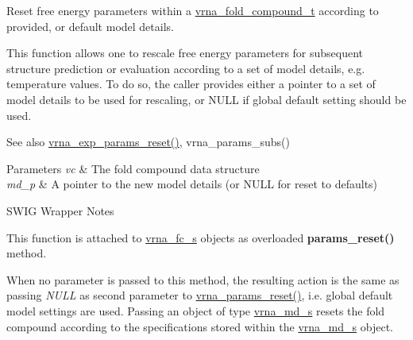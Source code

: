 Reset free energy parameters within a \hyperlink{group__fold__compound_ga1b0cef17fd40466cef5968eaeeff6166}{vrna\+\_\+fold\+\_\+compound\+\_\+t} according to provided, or default model details. 

This function allows one to rescale free energy parameters for subsequent structure prediction or evaluation according to a set of model details, e.\+g. temperature values. To do so, the caller provides either a pointer to a set of model details to be used for rescaling, or N\+U\+LL if global default setting should be used.

\begin{DoxySeeAlso}{See also}
\hyperlink{group__energy__parameters_gaa5409218068be84d7b50c78fbdaa85a9}{vrna\+\_\+exp\+\_\+params\+\_\+reset()}, vrna\+\_\+params\+\_\+subs() 
\end{DoxySeeAlso}

\begin{DoxyParams}{Parameters}
{\em vc} & The fold compound data structure \\
\hline
{\em md\+\_\+p} & A pointer to the new model details (or N\+U\+LL for reset to defaults)\\
\hline
\end{DoxyParams}
\begin{DoxyRefDesc}{S\+W\+I\+G Wrapper Notes}
\item[\hyperlink{wrappers__wrappers000081}{S\+W\+I\+G Wrapper Notes}]This function is attached to \hyperlink{group__fold__compound_structvrna__fc__s}{vrna\+\_\+fc\+\_\+s} objects as overloaded {\bfseries params\+\_\+reset()} method.

When no parameter is passed to this method, the resulting action is the same as passing {\itshape N\+U\+LL} as second parameter to \hyperlink{group__energy__parameters_gac40dc82e48a72a97cfc58b9da08a7792}{vrna\+\_\+params\+\_\+reset()}, i.\+e. global default model settings are used. Passing an object of type \hyperlink{group__model__details_structvrna__md__s}{vrna\+\_\+md\+\_\+s} resets the fold compound according to the specifications stored within the \hyperlink{group__model__details_structvrna__md__s}{vrna\+\_\+md\+\_\+s} object. \end{DoxyRefDesc}
\mbox{\label{group__energy__parameters_gaa5409218068be84d7b50c78fbdaa85a9}} 
